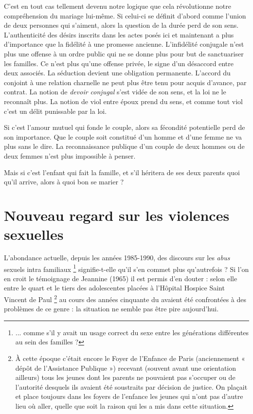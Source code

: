  C'est en tout cas tellement devenu notre logique que cela révolutionne notre compréhension du mariage lui-même. Si celui-ci se définit d'abord comme l'union de deux personnes qui s'aiment, alors la question de la durée perd de son sens. L'authenticité des désirs inscrits dans les actes posés ici et maintenant a plus d'importance que la fidélité à une promesse ancienne. L'infidélité conjugale n'est plus une offense à un ordre public qui ne se donne plus pour but de sanctuariser les familles. Ce n'est plus qu'une offense privée, le signe d'un désaccord entre deux associés. La séduction devient une obligation permanente. L'accord du conjoint à une relation charnelle ne peut plus être tenu pour acquis d'avance, par contrat. La notion de \emph{devoir conjugal} s'est vidée de son sens, et la loi ne le reconnaît plus. La notion de viol entre époux prend du sens, et comme tout viol c'est un délit punissable par la loi. 

 Si c'est l'amour mutuel qui fonde le couple, alors sa fécondité potentielle perd de son importance. Que le couple soit constitué d'un homme et d'une femme ne va plus sans le dire. La reconnaissance publique d'un couple de deux hommes ou de deux femmes n'est plus impossible à penser. 

 Mais si c'est l'enfant qui fait la famille, et s'il héritera de ses deux parents quoi qu'il arrive, alors à quoi bon se marier ?

 
 \section{Nouveau regard sur les violences sexuelles}

L'abondance actuelle, depuis les années 1985-1990, des discours sur les \emph{abus} sexuels intra familiaux 
\footnote{... comme s'il y avait un usage correct du sexe entre les générations différentes au sein des familles ?} 
signifie-t-elle qu'il s'en commet plus qu'autrefois ? Si l'on en croit le témoignage de Jeannine  (1965) il est permis d'en douter : selon elle entre le quart et le tiers des adolescentes placées à l'Hôpital Hospice Saint Vincent de Paul
\footnote{À cette époque c'était encore le Foyer de l'Enfance de Paris (anciennement « dépôt de l'Assistance Publique ») recevant (souvent avant une orientation ailleurs) tous les jeunes dont les parents ne pouvaient pas s'occuper ou de l'autorité desquels ils avaient été soustraits par décision de justice. On plaçait et place toujours dans les foyers de l'enfance les jeunes qui n'ont pas d'autre lieu où aller, quelle que soit la raison qui les a mis dans cette situation.} 
 au cours des années cinquante du  avaient été confrontées à des problèmes de ce genre : la situation ne semble pas être pire aujourd'hui. 
 

